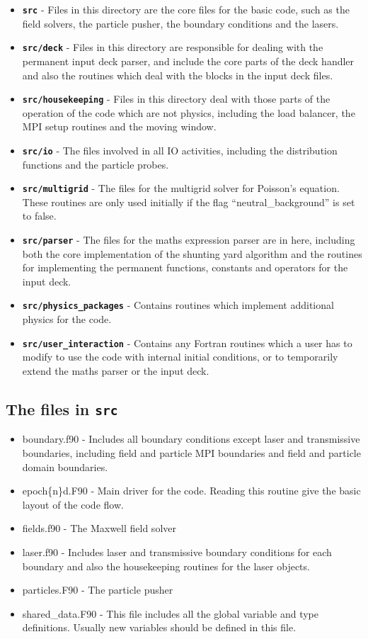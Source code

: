 \documentclass[12pt,a4paper]{article}
\newcommand{\inlinecode}[1]{{\color{warwickred} \bf\texttt{#1}}}
\newcommand{\EPOCH}{{\color{warwickdark}\fontfamily{phv}\selectfont{EPOCH}}}
\begin{document}
\begin{itemize}
\item \inlinecode{src} - Files in this directory are the core files for the
  basic {\EPOCH} code, such as the field solvers, the particle pusher, the
  boundary conditions and the lasers.
\item \inlinecode{src/deck} - Files in this directory are responsible for
  dealing with the permanent input deck parser, and include the core parts of
  the deck handler and also the routines which deal with the blocks in the
  input deck files.
\item \inlinecode{src/housekeeping} - Files in this directory deal with those
  parts of the operation of the code which are not physics, including the load
  balancer, the MPI setup routines and the moving window.
\item \inlinecode{src/io} - The files involved in all IO activities, including
  the distribution functions and the particle probes.
\item \inlinecode{src/multigrid} - The files for the multigrid solver for
  Poisson's equation. These routines are only used initially if the flag
  ``neutral\_background'' is set to false.
\item \inlinecode{src/parser} - The files for the maths expression parser are
  in here, including both the core implementation of the shunting yard
  algorithm and the routines for implementing the permanent functions,
  constants and operators for the input deck.
\item \inlinecode{src/physics\_packages} - Contains routines which implement
  additional physics for the code.
\item \inlinecode{src/user\_interaction} - Contains any Fortran routines which
  a user has to modify to use the code with internal initial conditions, or to
  temporarily extend the maths parser or the input deck.
\end{itemize}

\subsection{The files in \inlinecode{src}}
\begin{itemize}
\item boundary.f90 - Includes all boundary conditions except laser and
  transmissive boundaries, including field and particle MPI boundaries and
  field and particle domain boundaries.
\item epoch\{n\}d.F90 - Main driver for the code. Reading this routine give
  the basic layout of the code flow.
\item fields.f90 - The Maxwell field solver
\item laser.f90 - Includes laser and transmissive boundary conditions for each
  boundary and also the housekeeping routines for the laser objects.
\item particles.F90 - The particle pusher
\item shared\_data.F90 - This file includes all the global variable and type
  definitions. Usually new variables should be defined in this file.
\end{itemize}
\end{document}
